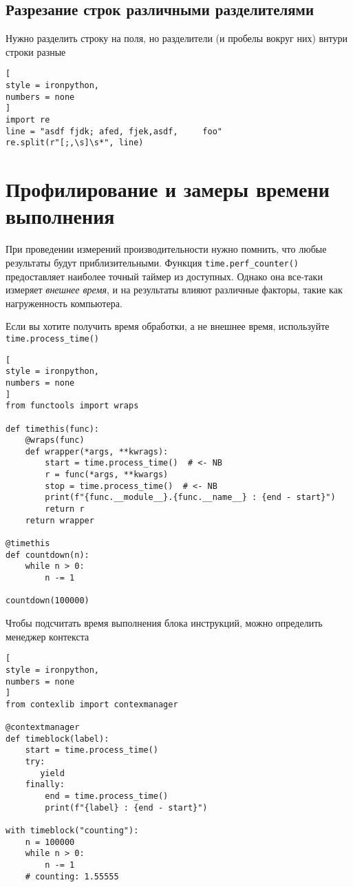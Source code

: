 \documentclass[%
	11pt,
	a4paper,
	utf8,
		]{article}
\begin{document}
\subsection{Разрезание строк различными разделителями}

Нужно разделить строку на поля, но разделители (и пробелы вокруг них) внтури строки разные
\begin{lstlisting}[
style = ironpython,
numbers = none
]
import re
line = "asdf fjdk; afed, fjek,asdf,     foo"
re.split(r"[;,\s]\s*", line)
\end{lstlisting}





\section{Профилирование и замеры времени выполнения}

При проведении измерений производительности нужно помнить, что любые результаты будут приблизительными. Функция \texttt{time.perf\_counter()} предоставляет наиболее точный таймер из доступных. Однако она все-таки измеряет \emph{внешнее время}, и {\color{red}на результаты влияют различные факторы, такие как нагруженность компьютера}.

Если вы хотите получить время обработки, а не внешнее время, используйте \texttt{time.process\_time()} \cite[]{beazley:python_cookbook-2019}
\begin{lstlisting}[
style = ironpython,
numbers = none
]
from functools import wraps

def timethis(func):
    @wraps(func)
    def wrapper(*args, **kwrags):
        start = time.process_time()  # <- NB
        r = func(*args, **kwargs)
        stop = time.process_time()  # <- NB
        print(f"{func.__module__}.{func.__name__} : {end - start}")
        return r
    return wrapper
    
@timethis
def countdown(n):
    while n > 0:
        n -= 1

countdown(100000)
\end{lstlisting}

Чтобы подсчитать время выполнения блока инструкций, можно определить менеджер контекста
\begin{lstlisting}[
style = ironpython,
numbers = none
]
from contexlib import contexmanager

@contextmanager
def timeblock(label):
    start = time.process_time()
    try:
       yield
    finally:
        end = time.process_time()
        print(f"{label} : {end - start}")
        
with timeblock("counting"):
	n = 100000
	while n > 0:
	    n -= 1
	# counting: 1.55555
\end{lstlisting}
\end{document}
